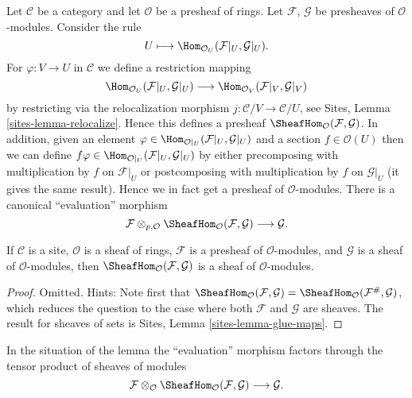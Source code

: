 \noindent
Let $\mathcal{C}$ be a category and let $\mathcal{O}$ be a presheaf
of rings. Let $\mathcal{F}$, $\mathcal{G}$ be presheaves of
$\mathcal{O}$-modules. Consider the rule
$$
U \longmapsto \Hom_{\mathcal{O}_U}(\mathcal{F}|_U, \mathcal{G}|_U).
$$
For $\varphi : V \to U$ in $\mathcal{C}$ we define a restriction mapping
$$
\Hom_{\mathcal{O}_U}(\mathcal{F}|_U, \mathcal{G}|_U)
\longrightarrow
\Hom_{\mathcal{O}_V}(\mathcal{F}|_V, \mathcal{G}|_V)
$$
by restricting via the relocalization morphism
$j : \mathcal{C}/V \to \mathcal{C}/U$, see
Sites, Lemma \ref{sites-lemma-relocalize}. Hence this defines a
presheaf $\SheafHom_\mathcal{O}(\mathcal{F}, \mathcal{G})$.
In addition, given an element
$\varphi \in \Hom_{\mathcal{O}|_U}(\mathcal{F}|_U, \mathcal{G}|_U)$
and a section $f \in \mathcal{O}(U)$ then we can define
$f\varphi \in \Hom_{\mathcal{O}|_U}(\mathcal{F}|_U, \mathcal{G}|_U)$
by either precomposing with multiplication by $f$ on $\mathcal{F}|_U$
or postcomposing with multiplication by $f$ on $\mathcal{G}|_U$ (it gives
the same result). Hence we in fact get a presheaf of $\mathcal{O}$-modules.
There is a canonical ``evaluation'' morphism
$$
\mathcal{F}
\otimes_{p, \mathcal{O}}
\SheafHom_\mathcal{O}(\mathcal{F}, \mathcal{G})
\longrightarrow
\mathcal{G}.
$$

\begin{lemma}
\label{lemma-internal-hom}
If $\mathcal{C}$ is a site, $\mathcal{O}$ is a sheaf of rings,
$\mathcal{F}$ is a presheaf of $\mathcal{O}$-modules, and
$\mathcal{G}$ is a sheaf of $\mathcal{O}$-modules, then
$\SheafHom_\mathcal{O}(\mathcal{F}, \mathcal{G})$
is a sheaf of $\mathcal{O}$-modules.
\end{lemma}

\begin{proof}
Omitted. Hints: Note first that
$\SheafHom_\mathcal{O}(\mathcal{F}, \mathcal{G})
= \SheafHom_\mathcal{O}(\mathcal{F}^\#, \mathcal{G})$, which reduces
the question to the case where both $\mathcal{F}$ and $\mathcal{G}$
are sheaves. The result for sheaves of sets is
Sites, Lemma \ref{sites-lemma-glue-maps}.
\end{proof}

\noindent
In the situation of the lemma the ``evaluation'' morphism
factors through the tensor product of sheaves of modules
$$
\mathcal{F}
\otimes_\mathcal{O}
\SheafHom_\mathcal{O}(\mathcal{F}, \mathcal{G})
\longrightarrow
\mathcal{G}.
$$

